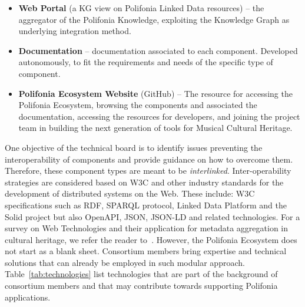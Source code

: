 \begin{itemize}
\item \textbf{Web Portal} (a KG view on Polifonia Linked Data resources) -- the aggregator of the Polifonia Knowledge, exploiting the Knowledge Graph as underlying integration method.
\item \textbf{Documentation} -- documentation associated to each component. Developed autonomously, to fit the requirements and needs of the specific type of component.
\item \textbf{Polifonia Ecosystem Website} (GitHub) -- The resource for accessing the Polifonia Ecosystem, browsing the components and associated the documentation, accessing the resources for developers, and joining the project team in building the next generation of tools for Musical Cultural Heritage.
\end{itemize}
%

One objective of the technical board is to identify issues preventing the interoperability of components and provide guidance on how to overcome them. Therefore, these component types are meant to be \textit{interlinked}. Inter-operability strategies are considered based on W3C and other industry standards for the development of distributed systems on the Web.
These include: W3C specifications such as RDF, SPARQL protocol, Linked Data Platform and the Solid project but also OpenAPI, JSON, JSON-LD and related technologies.
For a survey on  Web Technologies and their application for metadata aggregation in cultural heritage, we refer the reader to~\cite{freire2017web,daga2021integrating}.
However, the Polifonia Ecosystem does not start as a blank sheet. 
Consortium members bring expertise and technical solutions that can already be employed in such modular approach.
Table~\ref{tab:technologies} list technologies that are part of the background of consortium members and that may contribute towards supporting Polifonia applications.

